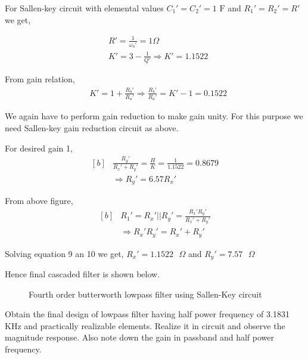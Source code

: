 \documentclass[a4paper,11pt]{article}
\begin{document}
For Sallen-key circuit with elemental values $C_1'=C_2'=1\text{ F}$ and $R_1'=R_2'=R'$we get,

\begin{equation*}
    \begin{aligned}
         & R'=\frac{1}{\omega_o'}=1 \Omega        \\
         & K'=3-\frac{1}{Q'}\Rightarrow K'=1.1522
    \end{aligned}
\end{equation*}

From gain relation,
\begin{equation*}
    \begin{aligned}
         & K'=1+\frac{R_b'}{R_a'}\Rightarrow \frac{R_b'}{R_a'}=K'-1=0.1522
    \end{aligned}
\end{equation*}


We again have to perform gain reduction to make gain unity. For this purpose we need Sallen-key gain reduction circuit as above.

For desired gain 1,
\begin{equation}
    \begin{aligned}[b]
         & \frac{R_y'}{R_x'+R_y'}=\frac{H}{K}=\frac{1}{1.1522}=0.8679 \\
         & \Rightarrow R_y'= 6.57 R_x'
    \end{aligned}
\end{equation}

From above figure,
\begin{equation}
    \begin{aligned}[b]
         & R_1'=R_x'||R_y'=\frac{R_x'R_y'}{R_x'+R_y'} \\
         & \Rightarrow R_x'R_y'=R_x'+R_y'
    \end{aligned}
\end{equation}


Solving equation 9 an 10 we get, $R_x'=1.1522 \text{ } \Omega$ and $R_y'=7.57\text{ }\Omega$


Hence final cascaded filter is shown below.
\begin{figure}[H]
    \centering
    \scalebox{1.15}
    \figfourthorder
    \caption{Fourth order butterworth lowpass filter using Sallen-Key circuit}
\end{figure}


\pagebreak
\begin{Q}
    {
        Obtain the final design of lowpass filter having half power frequency of 3.1831 KHz and
        practically realizable elements. Realize it in circuit and observe the magnitude response. Also note
        down the gain in passband and half power frequency.
    }
\end{Q}
\end{document}

